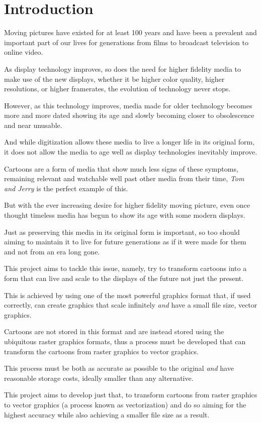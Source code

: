 \documentclass[12pt]{article}
\newcommand{\sentence}{} %
\newcommand{\italic}[1]{\textit{#1}}
\begin{document}
    \pagebreak



    \section{Introduction}\label{sec:introduction}

    \tab
    Moving pictures have existed for at least 100 years and have been a prevalent and important part of our lives for
    generations from films to broadcast television to online video.
    \sentence
    As display technology improves, so does the need for higher fidelity media to make use of the new displays,
    whether it be higher color quality, higher resolutions, or higher framerates, the evolution of technology never
    stops.
    \sentence
    However, as this technology improves, media made for older technology becomes more and more dated showing its age
    and slowly becoming closer to obsolescence and near unusable.
    \sentence
    And while digitization allows these media to live a longer life in its original form, it does not allow the media
    to age well as display technologies inevitably improve.
    \sentence
    Cartoons are a form of media that show much less signs of these symptoms, remaining relevant and watchable well
    past other media from their time, \italic{Tom and Jerry} is the perfect example of this.
    \sentence
    But with the ever increasing desire for higher fidelity moving picture, even once thought timeless media has
    begun to show its age with some modern displays.
    \sentence
    Just as preserving this media in its original form is important, so too should aiming to maintain it to live for
    future generations as if it were made for them and not from an era long gone.

    \bigskip
    This project aims to tackle this issue, namely, try to transform cartoons into a form that can live and scale to
    the displays of the future not just the present.
    \sentence
    This is achieved by using one of the most powerful graphics format that, if used correctly, can create graphics that
    scale infinitely \italic{and} have a small file size, vector graphics.
    \sentence
    Cartoons are not stored in this format and are instead stored using the ubiquitous raster graphics formats, thus
    a process must be developed that can transform the cartoons from raster graphics to vector graphics.
    \sentence
    This process must be both as accurate as possible to the original \italic{and} have reasonable storage costs,
    ideally smaller than any alternative.
    \sentence
    This project aims to develop just that, to transform cartoons from raster graphics to vector graphics (a process
    known as vectorization) and do so aiming for the highest accuracy while also achieving a smaller file size as a
    result.
\end{document}
